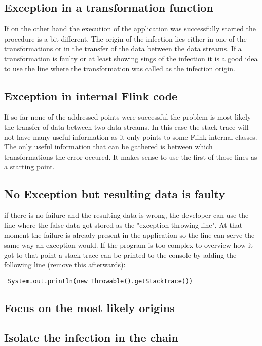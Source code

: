 \subsection{Exception in a transformation function}
 If on the other hand the execution of the application was successfully started the procedure is a bit different. The origin of the infection lies either in one of the transformations or in the transfer of the data between the data streams. If a transformation is faulty or at least showing sings of the infection it is a good idea to use the line where the transformation was called as the infection origin.

\subsection{Exception in internal Flink code}
If so far none of the addressed points were successful the problem is most likely the transfer of data between two data streams. In this case the stack trace will not have many useful information as it only points to some Flink internal classes. The only useful information that can be gathered is between which transformations the error occured. It makes sense to use the first of those lines as a starting point.

\subsection{No Exception but resulting data is faulty}
if there is no failure and the resulting data is wrong, the developer can use the line where the false data got stored as the "exception throwing line". At that moment the failure is already present in the application so the line can serve the same way an exception would. If the program is too complex to overview how it got to that point a stack trace can be printed to the console by adding the following line (remove this afterwards):
\begin{lstlisting}
 System.out.println(new Throwable().getStackTrace())
\end{lstlisting}

\subsection{Focus on the most likely origins}

\subsection{Isolate the infection in the chain}

